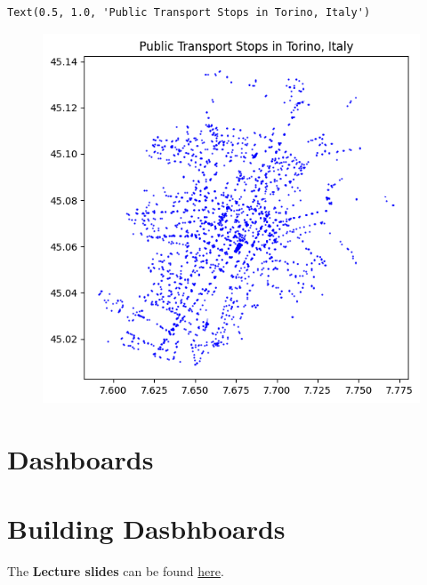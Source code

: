 \documentclass[
  letterpaper,
  DIV=11,
  numbers=noendperiod]{scrreprt}
\begin{document}
\begin{verbatim}
Text(0.5, 1.0, 'Public Transport Stops in Torino, Italy')
\end{verbatim}

\begin{figure}[H]

{\centering \includegraphics{labs/w07_OSM_files/figure-pdf/cell-46-output-2.png}

}

\end{figure}


\hypertarget{dashboards}{%
\chapter{Dashboards}\label{dashboards}}


\hypertarget{building-dasbhboards}{%
\chapter{Building Dasbhboards}\label{building-dasbhboards}}

The \textbf{Lecture slides} can be found
\href{https://github.com/GDSL-UL/wma/raw/main/lectures/w08.pdf}{here}.
\end{document}

